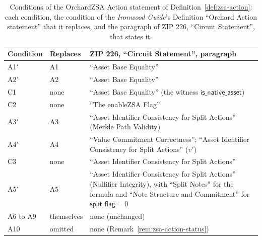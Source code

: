 \documentclass[11pt,a4paper]{article}
\theoremstyle{definition}
\begin{document}
\begin{table}[ht]
\centering\footnotesize\setlength{\tabcolsep}{4pt}
\begin{tabular}{@{}llp{10.6cm}@{}}
\toprule
Condition & Replaces
  & ZIP 226, ``Circuit Statement'', paragraph \tabularnewline
\midrule
A1$'$ & A1 & ``Asset Base Equality'' \tabularnewline
A2$'$ & A2 & ``Asset Base Equality'' \tabularnewline
C1 & none & ``Asset Base Equality'' (the witness
  $\mathsf{is\_native\_asset}$) \tabularnewline
C2 & none & ``The enableZSA Flag'' \tabularnewline
A3$'$ & A3 & ``Asset Identifier Consistency for Split Actions'' (Merkle
  Path Validity) \tabularnewline
A4$'$ & A4 & ``Value Commitment Correctness''; ``Asset Identifier
  Consistency for Split Actions'' ($v'$) \tabularnewline
C3 & none & ``Asset Identifier Consistency for Split Actions''
  \tabularnewline
A5$'$ & A5 & ``Asset Identifier Consistency for Split
  Actions'' (Nullifier Integrity), with ``Split Notes'' for the formula
  and ``Note Structure and Commitment'' for $\mathsf{split\_flag} = 0$
  \tabularnewline
A6 to A9 & themselves & none (unchanged) \tabularnewline
A10 & omitted & none (Remark~\ref{rem:zsa-action-status})
  \tabularnewline
\bottomrule
\end{tabular}
\caption{Conditions of the OrchardZSA Action statement of
Definition~\ref{def:zsa-action}: each condition, the condition of the
\emph{Ironwood Guide}'s Definition ``Orchard Action statement'' that it
replaces, and the paragraph of ZIP 226, ``Circuit Statement'', that states
it.}
\label{tab:action-delta}
\end{table}
\end{document}
